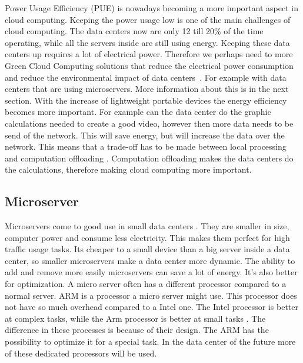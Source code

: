 \documentclass{sig-alternate-br}
\begin{document}
Power Usage Efficiency (PUE) is nowadays becoming a more important aspect in cloud computing. Keeping the power usage low is one of the main challenges of cloud computing. The data centers now are only 12 till 20\% of the time operating, while all the servers inside are still using energy. Keeping these data centers up requires a lot of electrical power. Therefore we perhaps need to more Green Cloud Computing solutions that reduce the electrical power consumption and reduce the environmental impact of data centers~\cite{beloglazov2012energy}. For example with data centers that are using microservers. More information about this is in the next section. \newline 
With the increase of lightweight portable devices the energy efficiency becomes more important. For example can the data center do the graphic calculations needed to create a good video, however then more data needs to be send of the network. This will save energy, but will increase the data over the network. This means that a trade-off has to be made between local processing and computation offloading \cite{Miettinen:2010:EEM:1863103.1863107}. Computation offloading makes the data centers do the calculations, therefore making cloud computing more important. 

\subsection{Microserver}
Microservers come to good use in small data centers \cite{microserver}.  They are smaller in size, computer power and consume less electricity. This makes them perfect for high traffic usage tasks.  Its cheaper to a small device than a big server inside a data center, so smaller microservers make a data center more dynamic. The ability to add and remove more easily microservers can save a lot of energy. It's also better for optimization. A micro server often has a different processor compared to a normal server. ARM is a processor a micro server might use. This processor does not have so much overhead compared to a Intel one. The Intel processor is better at complex tasks, while the Arm processor is better at small tasks \cite{microserver}. The difference in these processes is because of their design. The ARM has the possibility to optimize it for a special task. In the data center of the future more of these dedicated processors will be used. 
\end{document}
